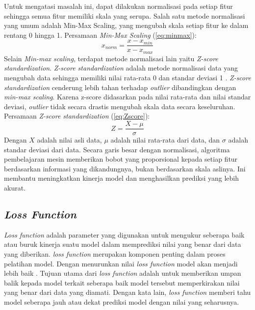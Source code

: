 Untuk mengatasi masalah ini, dapat dilakukan normalisasi pada setiap fitur sehingga semua fitur memiliki skala yang serupa. Salah satu metode normalisasi yang umum adalah Min-Max Scaling, yang mengubah skala setiap fitur ke dalam rentang 0 hingga 1. Persamaan \textit{Min-Max Scaling} (\ref{eq:minmax}):
 \begin{equation}
 x_{norm} = \frac{x-x_{min}}{x-x_{max}}
 \label{eq:minmax}
 \end{equation}
Selain \textit{Min-max scaling}, terdapat metode normalisasi lain  yaitu \textit{Z-score standardization}. \textit{Z-score standardization} adalah metode normalisasi data yang mengubah data sehingga memiliki nilai rata-rata 0 dan standar deviasi 1 \cite{Langr2019-xk}. \textit{Z-score standardization} cenderung lebih tahan terhadap \textit{outlier} dibandingkan dengan \textit{min-max scaling}. Karena z-score didasarkan pada nilai rata-rata dan nilai standar deviasi, \textit{outlier} tidak secara drastis mengubah skala data secara keseluruhan. Persamaan \textit{Z-score standardization} (\ref{eq:Zscore}):
\begin{equation}
    Z=\frac{X-\mu}{\sigma}
    \label{eq:Zscore}
\end{equation}
Dengan $X$ adalah nilai asli data, $\mu$ adalah nilai rata-rata dari data, dan $\sigma$ adalah standar deviasi dari data. Secara garis besar dengan normalisasi, algoritma pembelajaran mesin memberikan bobot yang proporsional kepada setiap fitur berdasarkan informasi yang dikandungnya, bukan berdasarkan skala aslinya. Ini membantu meningkatkan kinerja model dan menghasilkan prediksi yang lebih akurat.

\subsection{\textit{Loss Function}}

\textit{Loss function} adalah parameter yang digunakan untuk mengukur seberapa baik atau buruk kinerja suatu model dalam memprediksi nilai yang benar dari data yang diberikan. \textit{loss function} merupakan komponen penting dalam proses pelatihan model. Dengan menurunkan nilai \textit{loss function} model akan menjadi lebih baik \cite{GoodBengCour16}. Tujuan utama dari \textit{loss function} adalah untuk memberikan umpan balik kepada model terkait seberapa baik model tersebut memperkirakan nilai yang benar dari data yang diamati. Dengan kata lain, \textit{loss function} memberi tahu model seberapa jauh atau dekat prediksi model dengan nilai yang seharusnya.

